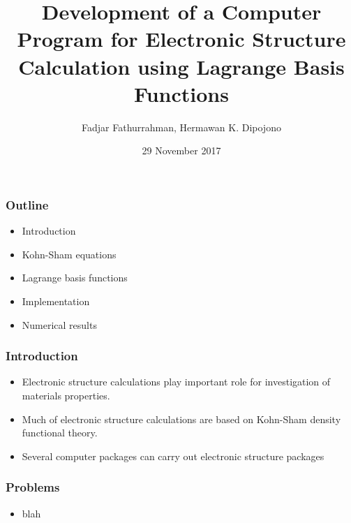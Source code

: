 \documentclass[10pt]{beamer}
\begin{document}
\title{Development of a Computer Program for Electronic Structure
Calculation using Lagrange Basis Functions}
\author{Fadjar Fathurrahman, Hermawan K. Dipojono}
\date{29 November 2017}

\frame{\titlepage}

\begin{frame}
\frametitle{Outline}

\begin{itemize}
\item Introduction
\item Kohn-Sham equations
\item Lagrange basis functions
\item Implementation
\item Numerical results
\end{itemize}

\end{frame}


\begin{frame}
\frametitle{Introduction}

\begin{itemize}
\item Electronic structure calculations play important role for investigation of materials
properties.
\item Much of electronic structure calculations are based on Kohn-Sham density functional theory.
\item Several computer packages can carry out electronic structure packages
\end{itemize}

\end{frame}


\begin{frame}
\frametitle{Problems}

\begin{itemize}
\item blah
\end{itemize}

\end{frame}
\end{document}
